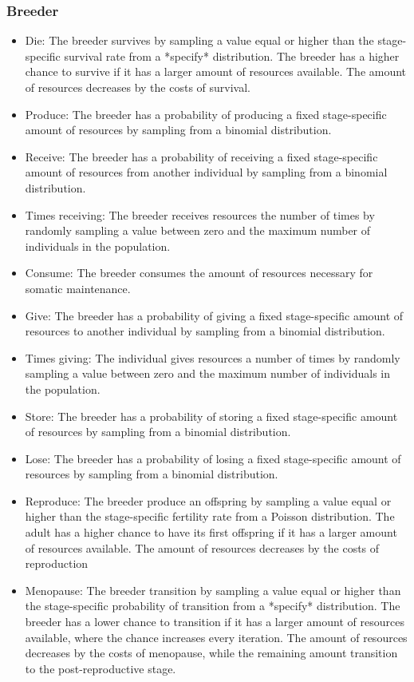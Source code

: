 \documentclass{article}
\begin{document}
\subsubsection{Breeder}

\begin{itemize}
    \item Die: The breeder survives by sampling a value equal or higher than the stage-specific survival rate from a *specify* distribution. The breeder has a higher chance to survive if it has a larger amount of resources available. The amount of resources decreases by the costs of survival.
    \item Produce: The breeder has a probability of producing a fixed stage-specific amount of resources by sampling from a binomial distribution.
    \item Receive: The breeder has a probability of receiving a fixed stage-specific amount of resources from another individual by sampling from a binomial distribution.
    \item Times receiving: The breeder receives resources the number of times by randomly sampling a value between zero and the maximum number of individuals in the population.
    \item Consume: The breeder consumes the amount of resources necessary for somatic maintenance.
    \item Give: The breeder has a probability of giving a fixed stage-specific amount of resources to another individual by sampling from a binomial distribution.
    \item Times giving: The individual gives resources a number of times by randomly sampling a value between zero and the maximum number of individuals in the population.
    \item Store: The breeder has a probability of storing a fixed stage-specific amount of resources by sampling from a binomial distribution.
    \item Lose: The breeder has a probability of losing a fixed stage-specific amount of resources by sampling from a binomial distribution.
   \item Reproduce: The breeder produce an offspring by sampling a value equal or higher than the stage-specific fertility rate from a Poisson distribution. The adult has a higher chance to have its first offspring if it has a larger amount of resources available. The amount of resources decreases by the costs of reproduction
    \item Menopause: The breeder transition by sampling a value equal or higher than the stage-specific probability of transition from a *specify* distribution. The breeder has a lower chance to transition if it has a larger amount of resources available, where the chance increases every iteration. The amount of resources decreases by the costs of menopause, while the remaining amount transition to the post-reproductive stage.
\end{itemize}
\end{document}
